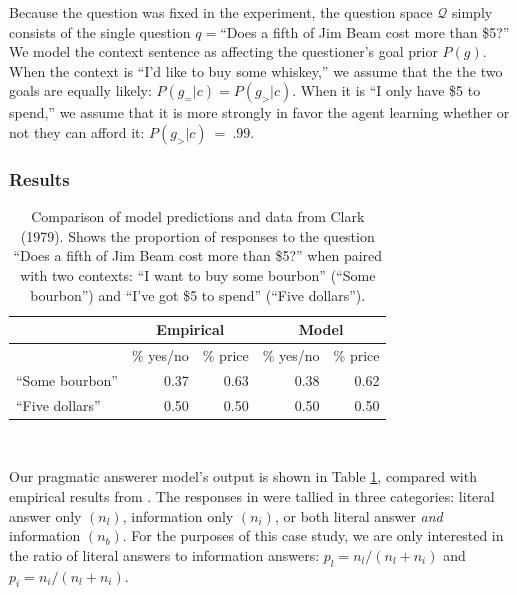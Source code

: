 \documentclass[12pt, floatsintext, jou]{apa6}
\begin{document}
Because the question was fixed in the experiment, the question space $\mathcal{Q}$ simply consists of the single question $q = $``Does a fifth of Jim Beam cost more than \$5?''  We model the context sentence as affecting the questioner's goal prior $P(g)$. When the context is ``I'd like to buy some whiskey,'' we assume that the the two goals are equally likely: $P(g_= | c) = P(g_> | c)$. When it is ``I only have \$5 to spend,'' we assume that it is more strongly in favor the agent learning whether or not they can afford it: $P(g_> | c)~=~.99$.


\subsubsection{Results} 


\begin{table}[t]
\centering
\begin{tabular}{ p{3cm} | r | r ||||||  r | r }
& \multicolumn{2}{c||||||}{Empirical} & \multicolumn{2}{c}{Model} \\
\hline
&           \% yes/no &   \%  price &           \% yes/no &   \%  price    \\
\hline
``Some bourbon'' &   0.37 & 0.63 &  0.38 & 0.62 \\
\hline
``Five dollars''     & 0.50 & 0.50 & 0.50 & 0.50 \\
\end{tabular}
\\[1.5pt]
\caption{Comparison of model predictions and data from Clark (1979). Shows the proportion of responses to the question ``Does a fifth of Jim Beam cost more than \$5?'' when paired with two contexts: ``I want to buy some bourbon'' (``Some bourbon'') and ``I've got \$5 to spend'' (``Five dollars''). } 
\label{table:clark79exp4}
\end{table}

Our pragmatic answerer model's output is shown in Table \ref{table:clark79exp4}, compared with empirical results from . The responses in  were tallied in three categories: literal answer only $(n_l)$, information only $(n_i)$, or both literal answer \emph{and} information $(n_b)$. For the purposes of this case study, we are only interested in the ratio of literal answers to information answers: $p_l = n_l/(n_l+n_i)$ and $p_i = n_i/(n_l+n_i)$.
\end{document}
